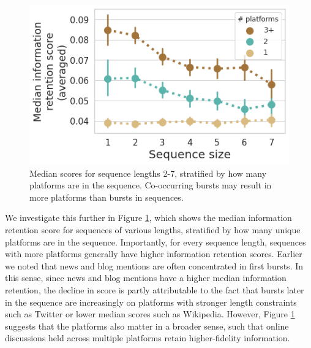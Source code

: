\documentclass[letterpaper]{article} %
\begin{document}
\begin{figure}[t]
\centering
\includegraphics[width=0.8\columnwidth]{figs/fig7_with6.png}
\caption{Median scores for sequence lengths 2-7, stratified by how many platforms are in the sequence. Co-occurring bursts may result in more platforms than bursts in sequences.}
\label{fig:heterogeneity}
\end{figure}

We investigate this further in Figure \ref{fig:heterogeneity}, which shows the median information retention score for sequences of various lengths, stratified by how many unique platforms are in the sequence. Importantly, for every sequence length, sequences with more platforms generally have higher information retention scores. Earlier we noted that news and blog mentions are often concentrated in first bursts. In this sense, since news and blog mentions have a higher median information retention, the decline in score is partly attributable to the fact that bursts later in the sequence are increasingly on platforms with stronger length constraints such as Twitter or lower median scores such as Wikipedia. However, Figure \ref{fig:heterogeneity} suggests that the platforms also matter in a broader sense, such that online discussions held across multiple platforms retain higher-fidelity information.
\end{document}
